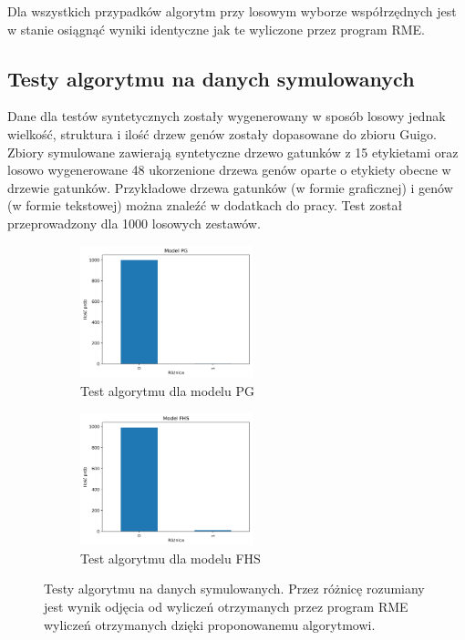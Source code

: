 \documentclass[licencjacka]{pracamgr}
\begin{document}
Dla wszystkich przypadków algorytm przy losowym wyborze współrzędnych jest w stanie osiągnąć wyniki identyczne jak te wyliczone przez program RME. 

\subsection{Testy algorytmu na danych symulowanych}
Dane dla testów syntetycznych zostały wygenerowany w sposób losowy jednak wielkość, struktura i ilość drzew genów zostały dopasowane do zbioru Guigo. Zbiory symulowane zawierają syntetyczne drzewo gatunków z 15 etykietami oraz losowo wygenerowane 48 ukorzenione drzewa genów oparte o etykiety obecne w drzewie gatunków. Przykładowe drzewa gatunków (w formie graficznej) i genów (w formie tekstowej) można znaleźć w dodatkach do pracy. Test został przeprowadzony dla 1000 losowych zestawów.

\begin{figure}[H]
\centering
\begin{subfigure}{.5\textwidth}
  \centering
  \includegraphics[width=50mm]{./pictures/PG.png}
  \caption{Test algorytmu dla modelu PG}
  \label{fig:sub2}
\end{subfigure}%
\begin{subfigure}{.5\textwidth}
  \centering
  \includegraphics[width=50mm]{./pictures/FHS.png}
  \caption{Test algorytmu dla modelu FHS}
  \label{fig:sub1}
\end{subfigure}%
\caption{Testy algorytmu na danych symulowanych. Przez różnicę rozumiany jest wynik odjęcia od wyliczeń otrzymanych przez program RME wyliczeń otrzymanych dzięki proponowanemu algorytmowi. }
\label{fig:test}
\end{figure}
\end{document}
